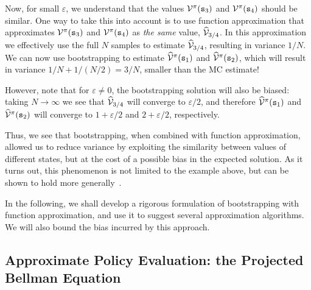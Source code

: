 Now, for small $\varepsilon$, we understand that the values $\mathcal{V}^{\pi}({\tt s}_3)$ and $\mathcal{V}^{\pi}({\tt s}_4)$ should be similar. One way to take this into account is to use function approximation that approximates $\mathcal{V}^{\pi}({\tt s}_3)$ and $\mathcal{V}^{\pi}({\tt s}_4)$ as \textit{the same} value, $\widehat{\mathcal{V}}_{3/4}$. In this approximation we effectively use the full $N$ samples to estimate $\widehat{\mathcal{V}}_{3/4}$, resulting in variance $1/{N}$. We can now use bootstrapping to estimate $\widehat{\mathcal{V}}^{\pi}({\tt s}_1)$ and $\widehat{\mathcal{V}}^{\pi}({\tt s}_2)$, which will result in variance $1 / {N}+ 1 / ({N}/{2}) = 3/{N}$, smaller than the MC estimate!

However, note that for $\varepsilon \neq 0$, the bootstrapping solution will also be biased: taking $N\to \infty$ we see that $\widehat{\mathcal{V}}_{3/4}$ will converge to $\varepsilon/2$, and therefore $\widehat{\mathcal{V}}^{\pi}({\tt s}_1)$ and $\widehat{\mathcal{V}}^{\pi}({\tt s}_2)$ will converge to $1+\varepsilon/2$ and $2+\varepsilon/2$, respectively.

Thus, we see that bootstrapping, when combined with function approximation, allowed us to reduce variance by exploiting the similarity between values of different states, but at the cost of a possible bias in the expected solution. As it turns out, this phenomenon is not limited to the example above, but can be shown to hold more generally~\cite{kearns2000bias}. 

In the following, we shall develop a rigorous formulation of bootstrapping with function approximation, and use it to suggest several approximation algorithms. We will also bound the bias incurred by this approach.

\subsection{Approximate Policy Evaluation: the Projected Bellman Equation}

